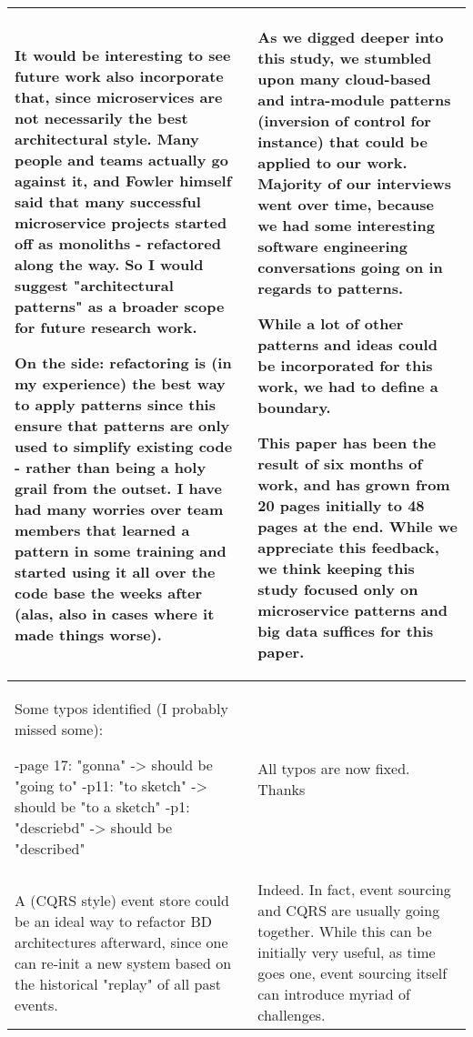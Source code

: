 \documentclass{article}
\begin{document}
\begin{longtable}{|p{7cm}|p{7cm}|}
    It would be interesting to see future work also incorporate that, since microservices are not necessarily the best architectural style. Many people and teams actually go against it, and Fowler himself said that many successful microservice projects started off as monoliths - refactored along the way.  So I would suggest "architectural patterns" as a broader scope for future research work.

    On the side: refactoring is (in my experience) the best way to apply patterns since this ensure that patterns are only used to simplify existing code -  rather than being a holy grail from the outset. I  have had many worries over team members that learned a pattern in some training and started using it all over the code base the weeks after (alas, also in cases where it made things worse). & 
    
    As we digged deeper into this study, we stumbled upon many cloud-based and intra-module patterns (inversion of control for instance) that could be applied to our work. Majority of our interviews went over time, because we had some interesting software engineering conversations going on in regards to patterns. 
    
    While a lot of other patterns and ideas could be incorporated for this work, we had to define a boundary.

    This paper has been the result of six months of work, and has grown from 20 pages initially to 48 pages at the end. While we appreciate this feedback, we think keeping this study focused only on microservice patterns and big data suffices for this paper. 
    
   
    
    
    \\ \hline
    \rule[-1.5ex]{0pt}{4.5ex} Some typos identified (I probably missed some):

    -page 17: "gonna" -> should be "going to"
    -p11: "to sketch" -> should be "to a sketch"
    -p1: "descriebd" -> should be "described" & All typos are now fixed. Thanks \\ \hline

    \rule[-1.5ex]{0pt}{4.5ex} A (CQRS style) event store could be an ideal way to refactor BD architectures afterward, since one can re-init a new system based on the historical "replay" of all past events. & Indeed. In fact, event sourcing and CQRS are usually going together. While this can be initially very useful, as time goes one, event sourcing itself can introduce myriad of challenges.


\end{longtable}
\end{document}
